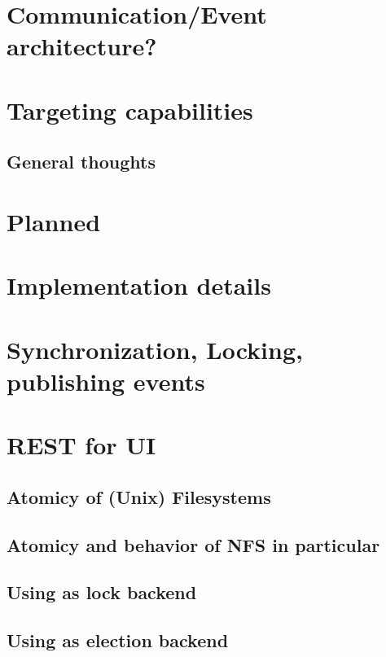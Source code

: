 
\section{Communication/Event architecture?}

\section{Targeting capabilities}

\subsection{General thoughts}

\section{Planned}

\section{Implementation details}

\section{Synchronization, Locking, publishing events}

\section{REST for UI}



\subsection{Atomicy of (Unix) Filesystems}

\subsection{Atomicy and behavior of NFS in particular}

\subsection{Using as lock backend}

\subsection{Using as election backend}




